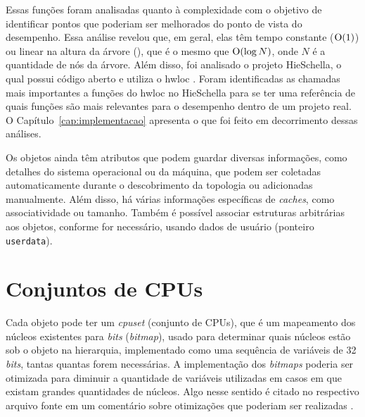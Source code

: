 Essas funções foram analisadas quanto à complexidade com o objetivo de identificar pontos que poderiam ser melhorados do ponto de vista do desempenho.
Essa análise revelou que, em geral, elas têm tempo constante ($\operatorname{O}(1)$) ou linear na altura da árvore (\Oalt), que é o mesmo que $\operatorname{O}(\log N)$, onde $N$ é a quantidade de nós da árvore.
Além disso, foi analisado o projeto HieSchella, o qual possui código aberto e utiliza o hwloc \cite{HieSchella}.
Foram identificadas as chamadas mais importantes a funções do hwloc no HieSchella para se ter uma referência
de quais funções são mais relevantes para o desempenho dentro de um projeto real.
O Capítulo~\ref{cap:implementacao} apresenta o que foi feito em decorrimento dessas análises.

Os objetos ainda têm atributos que podem guardar diversas informações, como detalhes do sistema operacional ou da máquina, que podem ser coletadas automaticamente durante o descobrimento da topologia ou adicionadas manualmente.
Além disso, há várias informações específicas de \textit{caches}, como associatividade ou tamanho.
Também é possível associar estruturas arbitrárias aos objetos, conforme for necessário, usando dados de usuário (ponteiro \texttt{userdata}).


\section{Conjuntos de CPUs}
\label{sec:conjuntos_de_cpus}

Cada objeto pode ter um \textit{cpuset} (conjunto de CPUs), que é um mapeamento dos núcleos existentes para \textit{bits} (\textit{bitmap}), usado para determinar quais núcleos estão sob o objeto na hierarquia, implementado como uma sequência de variáveis de 32 \textit{bits}, tantas quantas forem necessárias.
A implementação dos \textit{bitmaps} poderia ser otimizada para diminuir a quantidade de variáveis utilizadas em casos em que existam grandes quantidades de núcleos.
Algo nesse sentido é citado no respectivo arquivo fonte em um comentário sobre otimizações que poderiam ser realizadas \cite{hwlocCod}.